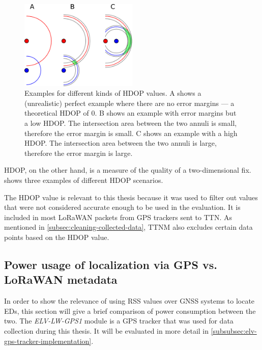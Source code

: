 \begin{figure}[htbp]
    \centering
    \includegraphics[width=0.5\textwidth]{pictures/multilateration/Geometric_Dilution_Of_Precision.eps}
    \caption{
        Examples for different kinds of \ac{HDOP} values.
        A shows a (unrealistic) perfect example where there are no error margins --- a theoretical \ac{HDOP} of 0.
        B shows an example with error margins but a low \ac{HDOP}.
        The intersection area between the two annuli is small, therefore the error margin is small.
        C shows an example with a high \ac{HDOP}.
        The intersection area between the two annuli is large, therefore the error margin is large.\cite{xoneca_english_2013}
    }\label{pic:hdop-example-diagram}
\end{figure}

\ac{HDOP}, on the other hand, is a measure of the quality of a two-dimensional fix.
 shows three examples of different \ac{HDOP} scenarios.

The \ac{HDOP} value is relevant to this thesis because it was used to filter out values that were not considered accurate enough to be used in the evaluation.
It is included in most \ac{LoRaWAN} packets from \ac{GPS} trackers sent to \ac{TTN}.
As mentioned in \cref{subsec:cleaning-collected-data}, \ac{TTNM} also excludes certain data points based on the \ac{HDOP} value.

\subsection{Power usage of localization via \acl{GPS} vs. \acs{LoRaWAN} metadata}\label{subsec:gnss-power-usage}

In order to show the relevance of using \ac{RSS} values over \ac{GNSS} systems to locate \aclp{ED}, this section will give a brief comparison of power consumption between the two.
The \emph{ELV-LW-GPS1} module is a \ac{GPS} tracker that was used for data collection during this thesis.
It will be evaluated in more detail in \cref{subsubsec:elv-gps-tracker-implementation}.

